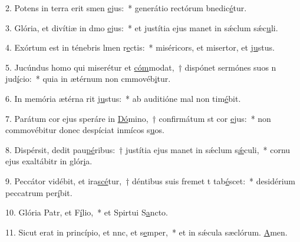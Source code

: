 2. Potens in terra erit smen \uline{e}jus:~* generátio rectórum bnedic\uline{é}tur.\par 
3. Glória, et divítiæ in dmo \uline{e}jus:~* et justítia ejus manet in sǽclum sǽc\uline{u}li.\par 
4. Exórtum est in ténebris lmen r\uline{e}ctis:~* miséricors, et misertor, et j\uline{u}stus.\par 
5. Jucúndus homo qui miserétur et \uline{cóm}modat,~† dispónet sermónes suos n jud\uline{í}cio:~* quia in ætérnum non cmmovéb\uline{i}tur.\par 
6. In memória ætérna rit j\uline{u}stus:~* ab auditióne mal non tim\uline{é}bit.\par 
7. Parátum cor ejus speráre in \uline{Dó}mino,~† confirmátum st cor \uline{e}jus:~* non commovébitur donec despíciat inmícos s\uline{u}os.\par 
8. Dispérsit, dedit pau\uline{pé}ribus:~† justítia ejus manet in sǽclum s\uline{ǽ}culi,~* cornu ejus exaltábitr in glór\uline{i}a.\par 
9. Peccátor vidébit, et ira\uline{scé}tur,~† déntibus suis fremet t tab\uline{é}scet:~* desidérium peccatrum per\uline{í}bit.\par 
10. Glória Patr, et F\uline{í}lio,~* et Spirtui S\uline{a}ncto.\par 
11. Sicut erat in princípio, et nnc, et s\uline{e}mper,~* et in sǽcula sæclórum. \uline{A}men.\par 
